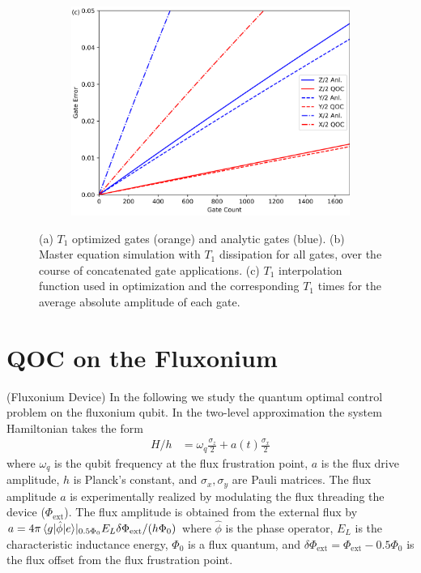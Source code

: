 \documentclass[
  amsfonts,
  amsmath,
  tbtags,
  amssymb,
  aps,
  nobibnotes,
  twocolumn,
]{revtex4-2}
\begin{document}
\begin{figure}[ht]
\begin{subfigure}{\linewidth}
    \includegraphics[width=\linewidth]{assets/f1c.png}
  \end{subfigure}
  \caption{(a) $T_{1}$ optimized gates (orange) and analytic gates (blue). (b) Master equation simulation with $T_{1}$ dissipation
    for all gates, over the course of concatenated gate applications. (c) $T_{1}$ interpolation function used in optimization
    and the corresponding $T_{1}$ times for the average absolute amplitude of each gate.}
\end{figure}


\section{QOC on the Fluxonium}
(Fluxonium Device) In the following we study
the quantum optimal control problem on the fluxonium qubit.
In the two-level
approximation the system Hamiltonian takes the form
\label{eq:hamiltonian}
\begin{align}
  H/h &= \omega_{q} \frac{\sigma_{z}}{2} + a(t) \frac{\sigma_{x}}{2}
\end{align}
where $\omega_{q}$ is the qubit frequency at the flux frustration point,
$a$ is the flux drive amplitude, $h$ is Planck's constant, and $\sigma_{x}, \sigma_{y}$
are Pauli matrices. The flux amplitude $a$ is experimentally
realized by modulating the flux 
threading the device ($\Phi_{\textrm{ext}}$).
The flux amplitude is obtained from the external flux by
$a = 4 \pi \braket{g \lvert \hat{\phi} \rvert e} \rvert_{0.5 \Phi_{0}} E_{L}
\delta \Phi_{\textrm{ext}} / (h \Phi_{0})$
where $\hat{\phi}$ is the phase operator, $E_{L}$ is the characteristic inductance energy, $\Phi_{0}$
is a flux quantum, and
$\delta \Phi_{\textrm{ext}} = \Phi_{\textrm{ext}} - 0.5 \Phi_{0}$ is the flux
offset from the flux frustration point.
\end{document}
